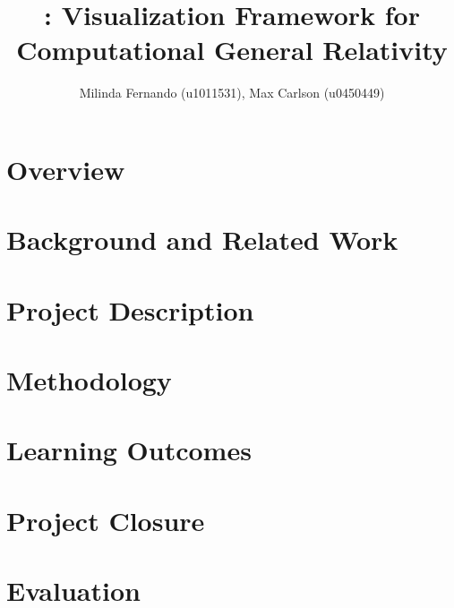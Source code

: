 \documentclass[a4paper,10pt]{article}
\title{\grvis : Visualization Framework for Computational General Relativity}
\author{Milinda Fernando (u1011531), Max Carlson (u0450449)}
\begin{document}
\maketitle

\section{Overview}


\section{Background and Related Work}


\section{Project Description}


\section{Methodology}


\section{Learning Outcomes}


\section{Project Closure}


\section{Evaluation}





\end{document}
